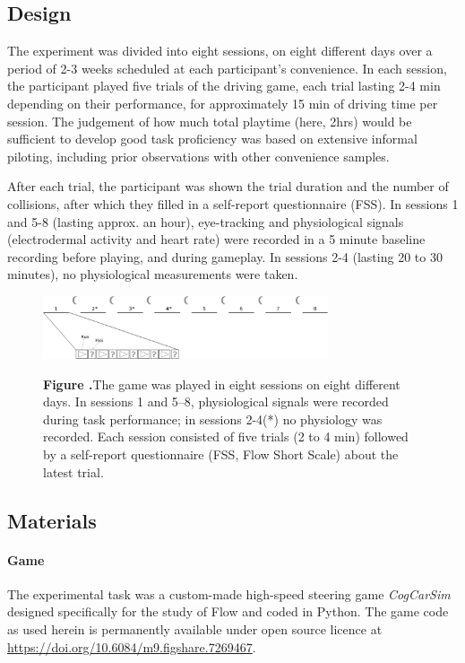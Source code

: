 \documentclass{frontierstyle/frontiersSCNS}
\newcommand{\nicewidth}{0.75\textwidth}
\newcommand{\tapprx}{\raisebox{0.4ex}{\texttildelow}}
\begin{document}
\subsection{Design}
The experiment was divided into eight sessions, on eight different days over a period of 2-3 weeks scheduled at each participant's convenience. In each session, the participant played five trials of the driving game, each trial lasting 2-4 min depending on their performance, for approximately 15 min of driving time per session. The judgement of how much total playtime (here, \tapprx2hrs) would be sufficient to develop good task proficiency was based on extensive informal piloting, including prior observations with other convenience samples.

After each trial, the participant was shown the trial duration and the number of collisions, after which they filled in a self-report questionnaire (FSS). In sessions 1 and 5-8 (lasting approx. an hour), eye-tracking and physiological signals (electrodermal activity and heart rate) were recorded in a 5 minute baseline recording before playing, and during gameplay. In sessions 2-4 (lasting 20 to 30 minutes), no physiological measurements were taken.

\begin{figure}[!ht]
\begin{center}
  \includegraphics[width=\nicewidth]{2_design}
\end{center}
  \textbf{\label{fig:design} Figure .}{The game was played in eight sessions on eight different days. In sessions 1 and 5--8, physiological signals were recorded during task performance; in sessions 2-4(*) no physiology was recorded. Each session consisted of five trials (2 to 4 min) followed by a self-report questionnaire (FSS, Flow Short Scale) about the latest trial.}
\end{figure}

\subsection{Materials}
\paragraph*{Game} The experimental task was a custom-made high-speed steering game {\it CogCarSim} designed specifically for the study of Flow and coded in Python. The game code as used herein is permanently available under open source licence at \url{https://doi.org/10.6084/m9.figshare.7269467}.
\end{document}
